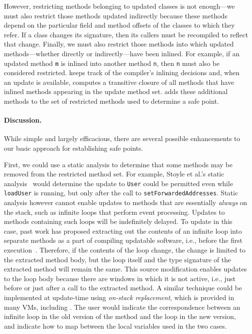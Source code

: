 However, restricting methods belonging to updated classes is not
enough---we must also restrict those methods updated indirectly %
because these methods
depend on the particular field and method offsets of the classes to
which they refer. If a class changes its signature, then its callers
must be recompiled to reflect that change.  Finally, we must also
restrict those methods into which updated methods---whether directly
or indirectly---have been inlined.  For example, if an updated method
\texttt{m} is inlined into another method \texttt{n}, then \texttt{n}
must also be considered restricted.  \DSU{} keeps track of the compiler's
inlining decisions and, when an update is available, computes a
transitive closure of all methods that have inlined methods
appearing in the update method set.  \DSU{} adds these additional
methods to the set of restricted methods used to determine a safe
point.

\paragraph{Discussion.}

While simple and largely efficacious, there are several possible
enhancements to our basic approach for establishing safe points.  

First, we could use
a static analysis to determine that some methods may be removed from
the restricted method set.  For example, Stoyle et al.'s static
analysis~\cite{StoyleHBSN06} would determine the update to \texttt{User}
could be permitted even while \texttt{loadUser} is running, but only
after the call to \texttt{setForwardedAddresses}.  Static analysis
however cannot enable updates to methods that are essentially
\emph{always} on the stack, such as infinite loops that perform event
processing.  Updates to methods containing such loops will be
indefinitely delayed.  To update in this case, past work has proposed
extracting out the contents of an infinite loop into separate methods
as a part of compiling updatable software, i.e., before the first
execution~\cite{neamtiu06dsu}.  Therefore, if the contents of the loop
change, the change is limited to the extracted method body, but the
loop itself and the type signature of the extracted method will remain
the same.  This source modification enables updates to the loop body
because there are windows in which it is not active, i.e., just before
or just after a call to the extracted method.
%
A similar technique could be implemented at update-time using \emph{on-stack
replacement}, which is provided in many VMs, including \JikesRVM{}.  The user would indicate the
correspondence between an infinite loop in the old version of the method and
the loop in the new version, and indicate how to map between the local
variables used in the two cases.

